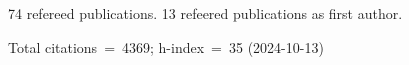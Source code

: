 74 refereed publications. 13 refeered publications as first author.

Total citations~=~4369; h-index~=~35 (2024-10-13)